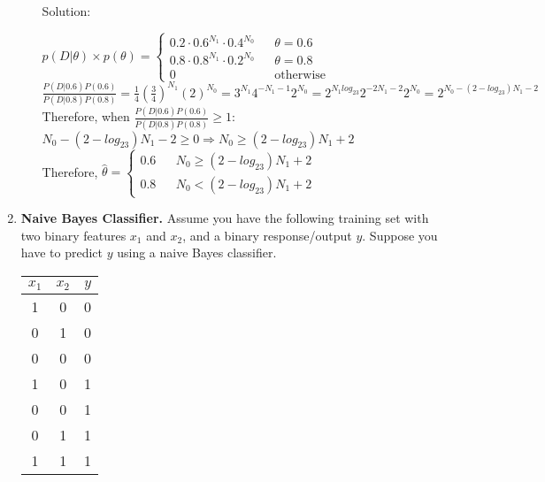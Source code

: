 \documentclass[12pt]{article}
\newcommand{\solu}{{\color{blue} Solution:}}
\begin{document}
\begin{enumerate}
\begin{enumerate}
            \solu 
            
            $p(D | \theta) \times p(\theta) =  \left\{
                \begin{array}{rcl}
                0.2\cdot 0.6^{N_1} \cdot 0.4^{N_0}  & & \theta = 0.6 \\
                0.8\cdot 0.8^{N_1} \cdot 0.2^{N_0} & & \theta = 0.8 \\
                0 & & \text{otherwise}
            \end{array}
            \right.$\\
            $\frac{P(D|0.6)P(0.6)}{P(D|0.8)P(0.8)} = \frac{1}{4}(\frac{3}{4})^{N_1}(2)^{N_0} = 3^{N_1}4^{-N_1-1}2^{N_0} = 2^{N_1log_23}2^{-2N_1 - 2}2^{N_0} = 2^{N_0 - (2-log_23)N_1 - 2}$\\
            Therefore, when $\frac{P(D|0.6)P(0.6)}{P(D|0.8)P(0.8)} \ge 1:$\\
            $N_0 -(2-log_23)N_1 -2 \ge 0 \Rightarrow N_0 \ge (2-log_23)N_1 +2$\\
            Therefore, $\hat{\theta} = \left\{
                \begin{array}{rcl}
                0.6 & & N_0 \ge (2-log_23)N_1 +2 \\
                0.8 & & N_0 < (2-log_23)N_1 +2
            \end{array}
            \right.$
        \end{enumerate}

        \item \textbf{Naive Bayes Classifier.} Assume you have the following training set with two binary features $x_1$ and $x_2$, and a binary response/output $y$. Suppose you have to predict $y$ using a naive Bayes classifier.
        \begin{center}
            \begin{tabular}{|c|c|c|}
                \hline 
                $x_1$ & $x_2$ & $y$\\ \hline 
                1 & 0 & 0\\ \hline 
                0 & 1 & 0\\ \hline 
                0 & 0 & 0\\ \hline 
                1 & 0 & 1\\ \hline 
                0 & 0 & 1\\ \hline 
                0 & 1 & 1\\ \hline 
                1 & 1 & 1 \\ \hline 
            \end{tabular}
        \end{center}
        

\end{enumerate}
\end{document}
